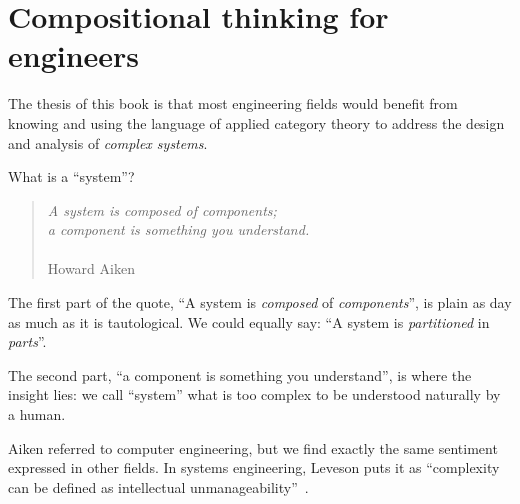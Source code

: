 
\section[Compositionality for engineers]{Compositional thinking for engineers}
\label{sec:compositionality-for-engineers}

The thesis of this book is that most engineering fields would benefit from knowing and using the language of applied category theory to address the design and analysis of \emph{complex systems}.


\label{subsec:introduction-systems-and-components}

What is a ``system''?

\cite{McIntyre1999Role}


\begin{quote}
    \emph{A system is composed of components; \\
        a component is something you understand.}\\ \\
    Howard Aiken
\end{quote}

The first part of the quote, ``A system is \emph{composed} of \emph{components}'', is plain as day as much as it is tautological.
We could equally say: ``A system is \emph{partitioned} in \emph{parts}''.

The second part, ``a component is something you understand'', is where the insight lies: we call ``system'' what is too complex to be understood naturally by a human.

Aiken referred to computer engineering, but we find exactly the same sentiment expressed in other fields.
In systems engineering, Leveson puts it as ``complexity can be defined as intellectual unmanageability''~\cite{leveson12engineering}.

